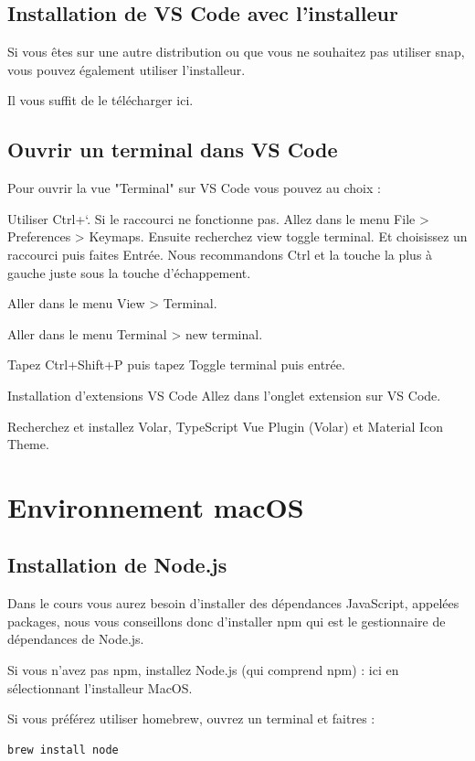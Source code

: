 \documentclass{article}
\begin{document}
\subsection{Installation de VS Code avec l'installeur}
Si vous êtes sur une autre distribution ou que vous ne souhaitez pas utiliser snap, vous pouvez également utiliser l'installeur.

Il vous suffit de le télécharger ici.

\subsection{Ouvrir un terminal dans VS Code}
Pour ouvrir la vue "Terminal" sur VS Code vous pouvez au choix :

Utiliser Ctrl+`. Si le raccourci ne fonctionne pas. Allez dans le menu File > Preferences > Keymaps. Ensuite recherchez view toggle terminal. Et choisissez un raccourci puis faites Entrée. Nous recommandons Ctrl et la touche la plus à gauche juste sous la touche d'échappement.

Aller dans le menu View > Terminal.

Aller dans le menu Terminal > new terminal.

Tapez Ctrl+Shift+P puis tapez Toggle terminal puis entrée.

Installation d'extensions VS Code
Allez dans l'onglet extension sur VS Code.

Recherchez et installez Volar, TypeScript Vue Plugin (Volar) et Material Icon Theme.

\section{Environnement macOS}
\subsection{Installation de Node.js}
Dans le cours vous aurez besoin d'installer des dépendances JavaScript, appelées packages, nous vous conseillons donc d'installer npm qui est le gestionnaire de dépendances de Node.js.

Si vous n'avez pas npm, installez Node.js (qui comprend npm) : ici en sélectionnant l'installeur MacOS.

Si vous préférez utiliser homebrew, ouvrez un terminal et faitres :

\begin{verbatim}
brew install node
\end{verbatim}
\end{document}
